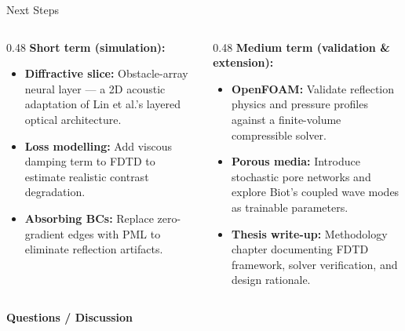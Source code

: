 \documentclass[aspectratio=169,11pt]{beamer}
\begin{document}
\begin{frame}{Next Steps}
  \begin{columns}[T]
    \begin{column}{0.48\textwidth}
      \footnotesize
      \textbf{Short term (simulation):}
      \begin{itemize}
        \item \textbf{Diffractive slice:} Obstacle-array neural layer — a 2D acoustic adaptation of Lin et al.'s layered optical architecture.
        \item \textbf{Loss modelling:} Add viscous damping term to FDTD to estimate realistic contrast degradation.
        \item \textbf{Absorbing BCs:} Replace zero-gradient edges with PML to eliminate reflection artifacts.
      \end{itemize}
    \end{column}
    \begin{column}{0.48\textwidth}
      \footnotesize
      \textbf{Medium term (validation \& extension):}
      \begin{itemize}
        \item \textbf{OpenFOAM:} Validate reflection physics and pressure profiles against a finite-volume compressible solver.
        \item \textbf{Porous media:} Introduce stochastic pore networks and explore Biot's coupled wave modes as trainable parameters.
        \item \textbf{Thesis write-up:} Methodology chapter documenting FDTD framework, solver verification, and design rationale.
      \end{itemize}
    \end{column}
  \end{columns}

  \vspace{0.3cm}
  \begin{center}
    \Large\textbf{\textcolor{gdpPurple}{Questions / Discussion}}
  \end{center}
\end{frame}
\end{document}
